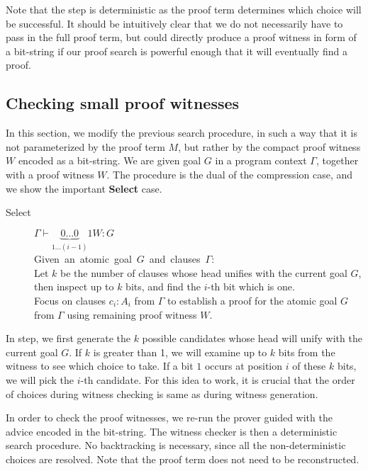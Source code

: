 \documentclass{llncs}
\newcommand{\vd}{\vdash}
\begin{document}
Note that the {} step is deterministic as the proof term
determines which choice will be successful. It should be intuitively
clear that we do not necessarily have to pass in the full proof term,
but could directly produce a proof witness in form of a bit-string if
our proof search is powerful enough that it will eventually find a
proof.

\subsection{Checking small proof witnesses}
In this section, we modify the previous search procedure, in such a
way that it is not parameterized by the proof term $M$, but rather by
the compact proof witness $W$ encoded as a bit-string. We are given
goal $G$ in a program context $\Gamma$, together with a proof witness
$W$. The procedure is the dual of the compression case, and we show
the important \mbox{{\bf Select}} case.

\begin{small}
\begin{description}
\item[Select] $\Gamma \vd \underset{1 \ldots
    (i-1)}{\underbrace{0\ldots 0}}1
W : G $ \\
    \mbox{Given an atomic goal $G$ and clauses $\Gamma$:}\hfill\\
    Let $k$ be the number of clauses whose head unifies with the
    current goal $G$, then inspect up to $k$ bits, and
    find the $i$-th bit which is one. \\ 
    Focus on clauses $c_i : A_i$ from $\Gamma$ to establish a proof
    for the atomic goal $G$ from $\Gamma$ using remaining proof witness $W$.
\end{description}
\end{small}    

In {} step, we first generate the $k$ possible candidates
whose head will unify with the current goal $G$. If $k$ is greater
than 1, we will examine up to $k$ bits from the witness to see which
choice to take. If a bit $1$ occurs at position $i$ of these $k$ bits,
we will pick the $i$-th candidate. For this idea to work, it is
crucial that the order of choices during witness checking is same as
during witness generation.

In order to check the proof witnesses, we re-run the prover guided
with the advice encoded in the bit-string. The witness checker is then
a deterministic search procedure. No backtracking is necessary, since
all the non-deterministic choices are resolved.
Note that the proof term does not need to be reconstructed. 
\end{document}
